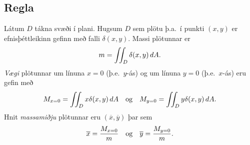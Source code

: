 \documentclass[a4paper,10pt,icelandic]{sphinxmanual}
\begin{document}
\subsection{Regla}
\label{Kafli4:id22}
Látum \(D\) tákna svæði í plani. Hugsum \(D\) sem plötu þ.a. í
punkti \((x,y)\) er efnisþéttleikinn gefinn með falli
\(\delta(x,y)\). Massi plötunnar er
\begin{gather}
\begin{split}\displaystyle m=\int\!\!\!\int_D \delta(x,y)\,dA.\end{split}\notag
\end{gather}
\emph{Vægi} plötunnar um línuna \(x=0\) (þ.e. \(y\)-ás) og um línuna
\(y=0\) (þ.e. \(x\)-ás) eru gefin með
\begin{gather}
\begin{split}\displaystyle M_{x=0}=\int\!\!\!\int_D x\delta(x,y)\,dA \quad \text{og} \quad M_{y=0}=\int\!\!\!\int_D y\delta(x,y)\,dA.\end{split}\notag
\end{gather}
Hnit \emph{massamiðju} plötunnar eru \((\overline{x}, \overline{y})\) þar
sem
\begin{gather}
\begin{split}\displaystyle \overline{x}=\frac{M_{x=0}}{m} \quad \text{og}\quad \overline{y}=\frac{M_{y=0}}{m}.\end{split}\notag
\end{gather}
\end{document}
